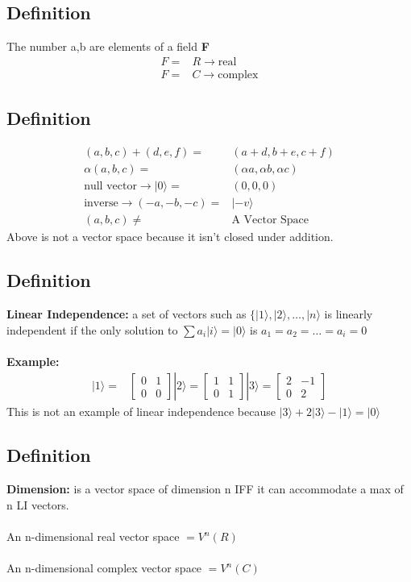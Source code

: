 \documentclass[12pt]{article}
\begin{document}
\subsection*{Definition} The number a,b are elements of a field \textbf{F}
\begin{align*}
F =& R \rightarrow \text{real}
\\
F =& C \rightarrow \text{complex}
\end{align*}

\subsection*{Definition} 
\begin{align*}
(a,b,c) + (d,e,f) =& (a+d,b+e,c+f)
\\
\alpha(a,b,c) =& (\alpha a, \alpha b, \alpha c)
\\ 
\text{null vector} \rightarrow |0\rangle =& (0,0,0)
\\
\text{inverse} \rightarrow (-a,-b,-c) =& |-v\rangle
\\
(a,b,c) \neq& \text{A Vector Space}
\end{align*}
Above is not a vector space because it isn't closed under addition.

\subsection*{Definition} 
\textbf{Linear Independence:} a set of vectors such as $\lbrace |1\rangle, |2\rangle, \dots, |n\rangle$ is linearly independent if the only solution to $\sum a_i |i\rangle = |0\rangle$ is $a_1 = a_2 = \dots = a_i = 0$
\\
\\
\textbf{Example:}
\begin{align*}
|1\rangle =& 
\begin{bmatrix}
0 & 1 \\
0 & 0
\end{bmatrix}
|2\rangle =
\begin{bmatrix}
1 & 1 \\
0 & 1
\end{bmatrix}
|3\rangle =
\begin{bmatrix}
2 & -1 \\
0 & 2
\end{bmatrix}
\end{align*}
This is not an example of linear independence because $|3\rangle + 2|3\rangle -|1\rangle = |0\rangle$

\subsection*{Definition}
\textbf{Dimension:} is a vector space of dimension n IFF it can accommodate a max of n LI vectors.\\
\\
An n-dimensional real vector space $= V^n(R)$\\
\\
An n-dimensional complex vector space $= V^n(C)$
\end{document}
